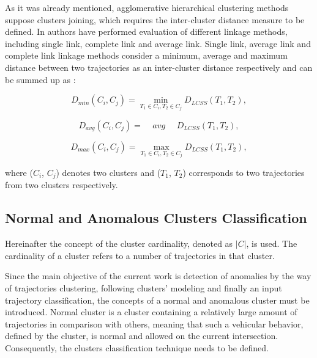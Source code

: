 As it was already mentioned, agglomerative hierarchical clustering methods suppose clusters joining, which requires the inter-cluster distance measure to be defined. In \cite{inproceedings:7_related_work} authors have performed evaluation of different linkage methods, including single link, complete link and average link. Single link, average link and complete link linkage methods consider a minimum, average and maximum distance between two trajectories as an inter-cluster distance respectively and can be summed up as \cite{inproceedings:7_related_work}:

\begin{equation} \label{eq:single_link}
	D_{min}(C_i, C_j) = \min_{T_1 \in C_i, T_2 \in C_j} D_{LCSS}(T_1, T_2),
\end{equation} 

\begin{equation} \label{eq:average_link}
	D_{avg}(C_i, C_j) = \ \ \ \ \ avg\ \ \ \ \ \ D_{LCSS}(T_1, T_2),
\end{equation} 

\begin{equation} \label{eq:complete_link}
	D_{max}(C_i, C_j) = \max_{T_1 \in C_i, T_2 \in C_j} D_{LCSS}(T_1, T_2),
\end{equation} 

where ($C_i$, $C_j$) denotes two clusters and ($T_1$, $T_2$) corresponds to two trajectories from two clusters respectively.

\subsection{Normal and Anomalous Clusters Classification}

Hereinafter the concept of the cluster cardinality, denoted as $|C|$, is used.
The cardinality of a cluster refers to a number of trajectories in that cluster.

Since the main objective of the current work is detection of anomalies by the way of trajectories clustering, following clusters' modeling and finally an input trajectory classification, the concepts of a normal and anomalous cluster must be introduced. Normal cluster is a cluster containing a relatively large amount of trajectories in comparison with others, meaning that such a vehicular behavior, defined by the cluster, is normal and allowed on the current intersection. Consequently, the clusters classification technique needs to be defined.

